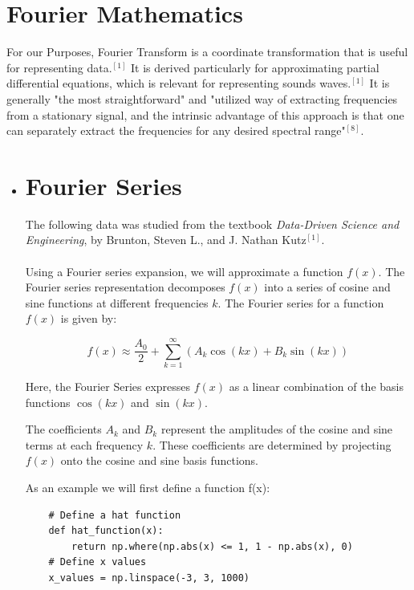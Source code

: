 \documentclass{article}
\begin{document}
\section*{Fourier Mathematics}
For our Purposes, Fourier Transform is a coordinate transformation that is useful  for representing data.$^{[1]}$ It is derived particularly for approximating partial differential equations, which is relevant for representing sounds waves.$^{[1]}$ It is generally "the most straightforward" and "utilized way of extracting frequencies from a stationary signal, and the intrinsic advantage of this approach is that one can separately extract the frequencies for any desired spectral range"$^{[8]}$.
\begin{itemize}
    \item{ 
    \section*{Fourier Series}

    The following data was studied from the textbook \textit{Data-Driven Science and Engineering}, by Brunton, Steven L., and J. Nathan Kutz$^{[1]}$.\\\\ 
    Using a Fourier series expansion, we will approximate a function \( f(x) \).  
    The Fourier series representation decomposes \( f(x) \) into a series of cosine and sine functions at different frequencies \( k \).  
    The Fourier series for a function \( f(x) \) is given by:

    \[
    f(x) \approx \frac{A_0}{2} + \sum_{k=1}^{\infty} \left(A_k \cos(kx) + B_k \sin(kx)\right)
    \]

    Here, the Fourier Series expresses \( f(x) \) as a linear combination of the basis functions \( \cos(kx) \) and \( \sin(kx) \).  

    The coefficients \( A_k \) and \( B_k \) represent the amplitudes of the cosine and sine terms at each frequency \( k \).  
    These coefficients are determined by projecting \( f(x) \) onto the cosine and sine basis functions.
    
    As an example we will first define a function f(x):
    \begin{verbatim}
    # Define a hat function
    def hat_function(x):
        return np.where(np.abs(x) <= 1, 1 - np.abs(x), 0)  
    # Define x values
    x_values = np.linspace(-3, 3, 1000)
    \end{verbatim}
    
}
\end{itemize}
\end{document}
